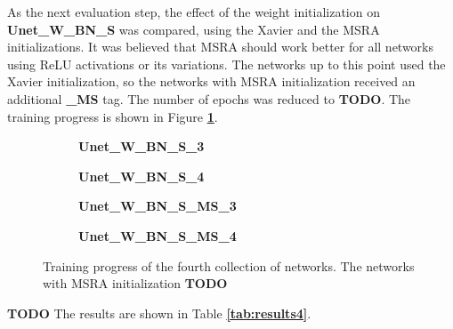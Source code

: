 \noindent As the next evaluation step, the effect of the weight initialization on \textbf{Unet\_W\_BN\_S} was compared, using the Xavier and the MSRA initializations. It was believed that MSRA should work better for all networks using ReLU activations or its variations. The networks up to this point used the Xavier initialization, so the networks with MSRA initialization received an additional \textbf{\_MS} tag. The number of epochs was reduced to \textbf{TODO}. The training progress is shown in Figure \textbf{\ref{fig:weighted_batchnorm_shuffle_msra_training}}.\\

\begin {figure}[!ht]
	\begin {subfigure}[b]{0.4\linewidth}
		\caption{\textbf{Unet\_W\_BN\_S\_3}}
	\end {subfigure}\hspace{1.75cm}
	\begin {subfigure}[b]{0.4\linewidth}
		\caption{\textbf{Unet\_W\_BN\_S\_4}}
	\end {subfigure}

	\begin {subfigure}[b]{0.4\linewidth}
		\caption{\textbf{Unet\_W\_BN\_S\_MS\_3}}
	\end {subfigure}\hspace{1.75cm}
	\begin {subfigure}[b]{0.4\linewidth}
		\caption{\textbf{Unet\_W\_BN\_S\_MS\_4}}
	\end {subfigure}

		\caption[Training progress of the fourth collection of networks.]{Training progress of the fourth collection of networks. The networks with MSRA initialization \textbf{TODO}}
		\label{fig:weighted_batchnorm_shuffle_msra_training}
\end {figure}


\textbf{TODO} The results are shown in Table \textbf{\ref{tab:results4}}. \\


